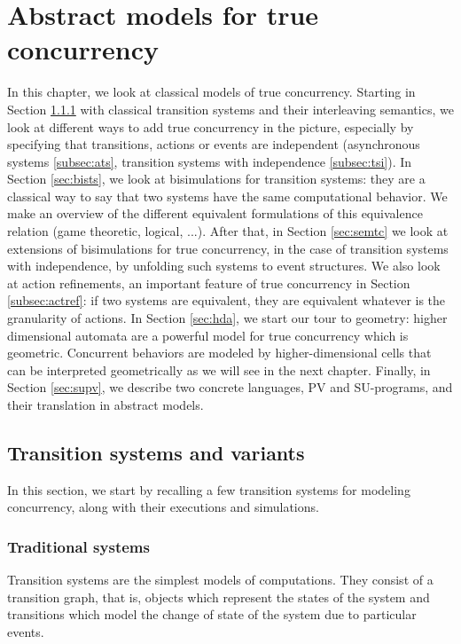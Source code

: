 \chapter{Abstract models for true concurrency}
\label{chap:absmod}



In this chapter, we look at classical models of true concurrency. Starting in Section \ref{sub:tradisys} with classical transition systems and their interleaving semantics, we look at different ways to add true concurrency in the picture, especially by specifying that transitions, actions or events are independent (asynchronous systems \ref{subsec:ats}, transition systems with independence \ref{subsec:tsi}). In Section \ref{sec:bists}, we look at bisimulations for transition systems: they are a classical way to say that two systems have the same computational behavior. We make an overview of the different equivalent formulations of this equivalence relation (game theoretic, logical, ...). After that, in Section \ref{sec:semtc} we look at extensions of bisimulations for true concurrency, in the case of transition systems with independence, by unfolding such systems to event structures. We also look at action refinements, an important feature of true concurrency in Section \ref{subsec:actref}: if two systems are equivalent, they are equivalent whatever is the granularity of actions. In Section \ref{sec:hda}, we start our tour to geometry: higher dimensional automata are a powerful model for true concurrency which is geometric. Concurrent behaviors are modeled by higher-dimensional cells that can be interpreted geometrically as we will see in the next chapter. Finally, in Section \ref{sec:supv}, we describe two concrete languages, PV and SU-programs, and their translation in abstract models.




\section{Transition systems and variants}

In this section, we start by recalling a few transition systems for modeling concurrency, along with their executions and simulations.

	\subsection{Traditional systems}
	\label{sub:tradisys}
	
	Transition systems are the simplest models of computations. They consist of a transition graph, that is, objects which represent the states of the system and transitions which model the change of state of the system due to particular events.
	
